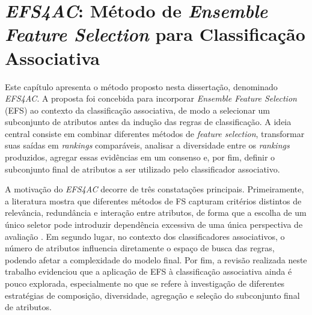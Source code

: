 %
\chapter{\textit{EFS4AC}: Método de \textit{Ensemble Feature Selection} para Classificação Associativa}
\label{cap:Metodologia}

Este capítulo apresenta o método proposto nesta dissertação, denominado
\textit{EFS4AC}. A proposta foi concebida para incorporar \textit{Ensemble
Feature Selection} (EFS) ao contexto da classificação associativa, de modo a
selecionar um subconjunto de atributos antes da indução das regras de
classificação. A ideia central consiste em combinar diferentes métodos de
\textit{feature selection}, transformar suas saídas em \textit{rankings}
comparáveis, analisar a diversidade entre os \textit{rankings} produzidos, agregar
essas evidências em um consenso e, por fim, definir o subconjunto final
de atributos a ser utilizado pelo classificador associativo.

A motivação do \textit{EFS4AC} decorre de três constatações principais.
Primeiramente, a literatura mostra que diferentes métodos de FS capturam
critérios distintos de relevância, redundância e interação entre atributos,
de forma que a escolha de um único seletor pode introduzir dependência excessiva
de uma única perspectiva de avaliação \cite{bolon2019ensembles,salman2026review}.
Em segundo lugar, no contexto dos classificadores associativos, o número de atributos influencia diretamente o espaço de busca das regras, podendo afetar a complexidade do modelo final. Por fim,
a revisão realizada neste trabalho evidenciou que a aplicação de EFS à
classificação associativa ainda é pouco explorada, especialmente no que se
refere à investigação de diferentes estratégias de composição, diversidade,
agregação e seleção do subconjunto final de atributos.

